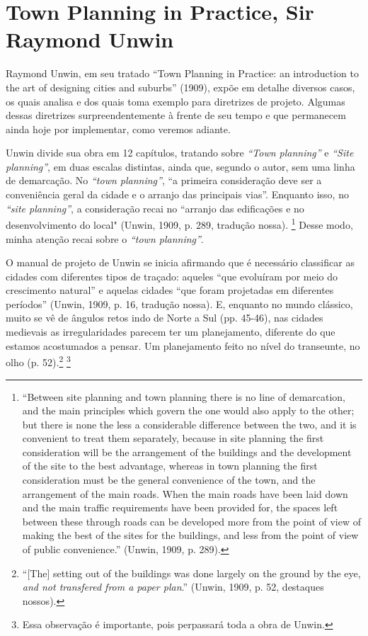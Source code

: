 \documentclass[12pt, a4paper]{book} %
\begin{document}
            \section{Town Planning in Practice, Sir Raymond Unwin}
        
        Raymond Unwin, em seu tratado ``Town Planning in Practice: an introduction to the art of designing cities and suburbs'' (1909), expõe em detalhe diversos casos, os quais analisa e dos quais toma exemplo para diretrizes de projeto. Algumas dessas diretrizes surpreendentemente à frente de seu tempo e que permanecem ainda hoje por implementar, como veremos adiante. 

        Unwin divide sua obra em 12 capítulos, tratando sobre \textit{``Town planning''} e \textit{``Site planning''}, em duas escalas distintas, ainda que, segundo o autor, sem uma linha de demarcação. No \textit{``town planning''}, ``a primeira consideração deve ser a conveniência geral da cidade e o arranjo das principais vias''. Enquanto isso, no \textit{``site planning''}, a consideração recai no ``arranjo das edificações e no desenvolvimento do local" (Unwin, 1909, p. 289, tradução nossa). 
            \footnote[11]{``Between site planning and town planning there is no line of demarcation, and the main principles which govern the one would also apply to the other; but there is none the less a considerable difference between the two, and it is convenient to treat them separately, because in site planning the first consideration will be the arrangement of the buildings and the development of the site to the best advantage, whereas in town planning the first consideration must be the general convenience of the town, and the arrangement of the main roads. When the main roads have been laid down and the main traffic requirements have been provided for, the spaces left between these through roads can be developed more from the point of view of making the best of the sites for the buildings, and less from the point of view of public convenience.'' (Unwin, 1909, p. 289).} 
        Desse modo, minha atenção recai sobre o \textit{``town planning''}.

        O manual de projeto de Unwin se inicia afirmando que é necessário classificar as cidades com diferentes tipos de traçado: aqueles ``que evoluíram por meio do crescimento natural'' e aquelas cidades ``que foram projetadas em diferentes períodos'' (Unwin, 1909, p. 16, tradução nossa). E, enquanto no mundo clássico, muito se vê de ângulos retos indo de Norte a Sul (pp. 45-46), nas cidades medievais as irregularidades parecem ter um planejamento, diferente do que estamos acostumados a pensar. Um planejamento feito no nível do transeunte, no olho (p. 52).\footnote[12]{``[The] setting out of the buildings was done largely on the ground by the eye, \textit{and not transfered from a paper plan}.'' (Unwin, 1909, p. 52, destaques nossos).}
        \footnote[13]{Essa observação é importante, pois perpassará toda a obra de Unwin.}
\end{document}
